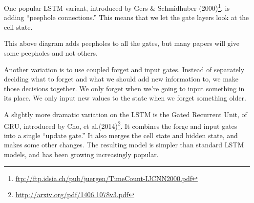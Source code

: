 \documentclass[12pt]{article} %
\begin{document}
One popular LSTM variant, introduced by Gers \& Schmidhuber (2000)\footnote{\url{ftp://ftp.idsia.ch/pub/juergen/TimeCount-IJCNN2000.pdf}}, is adding ``peephole connections.'' This means that we let the gate layers look at the cell state.

\begin{figure}[H] %
\label{fig:rnnunrolled}
\end{figure}

This above diagram adds peepholes to all the gates, but many papers will give some peepholes and not others.

Another variation is to use coupled forget and input gates. Instead of separately deciding what to forget and what we should add new information to, we make those decisions together. We only forget when we're going to input something in its place. We only input new values to the state when we forget something older.
\begin{figure}[H] %
\label{fig:rnnunrolled}
\end{figure}

A slightly more dramatic variation on the LSTM is the Gated Recurrent Unit, of GRU, introduced by Cho, et al.(2014)\footnote{\url{http://arxiv.org/pdf/1406.1078v3.pdf}}. It combines the forge and input gates into a single ``update gate.'' It also merges the cell state and hidden state, and makes some other changes. The resulting model is simpler than standard LSTM models, and has been growing increasingly popular.

\begin{figure}[H] %
\label{fig:rnnunrolled}
\end{figure}
\end{document}
